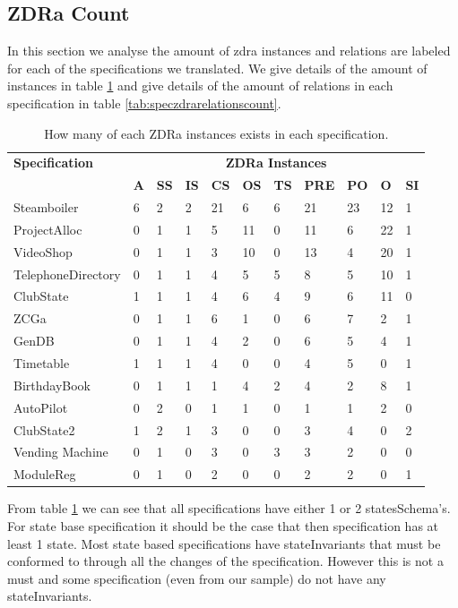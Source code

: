 \subsection{ZDRa Count}

In this section we analyse the amount of \gls{zdra} instances and relations are
labeled for each of the specifications we translated. We give details of the
amount of instances in table \ref{tab:speczdracount} and give details of the
amount of relations in each specification in table
\ref{tab:speczdrarelationscount}.

\begin{table}[H]
\centering
\begin{tabular}{|l |l | l |l | l| l | l | l | l | l | l |}
\hline
\textbf{Specification} & \multicolumn{10}{c|}{\textbf{ZDRa Instances}}\\
\cline{2-11}
 & \textbf{A} & \textbf{SS} & \textbf{IS} & \textbf{CS} & \textbf{OS} &
 \textbf{TS} & \textbf{PRE} & \textbf{PO} & \textbf{O} & \textbf{SI}  \\
\hline
Steamboiler & 6 & 2 & 2 & 21 & 6 & 6 & 21 & 23 & 12 & 1  \\
ProjectAlloc & 0 & 1 & 1 & 5 & 11 & 0 & 11 & 6 & 22 & 1 \\
VideoShop &  0 & 1 & 1 & 3 & 10 & 0 & 13 & 4 & 20 & 1  \\
TelephoneDirectory & 0 & 1 & 1 & 4 & 5 & 5 & 8 & 5 & 10 & 1 \\
ClubState & 1 & 1 & 1 & 4 & 6 & 4 & 9 & 6 & 11 & 0 \\
ZCGa & 0 & 1 & 1 & 6 & 1 & 0 & 6 & 7 & 2 & 1 \\
GenDB & 0 & 1 & 1 & 4 & 2 & 0 & 6 & 5 & 4 & 1 \\
Timetable & 1 & 1 & 1 & 4 & 0 & 0 & 4 & 5 & 0 & 1 \\
BirthdayBook & 0 & 1 & 1 & 1 & 4 & 2 & 4 & 2 & 8 & 1 \\
AutoPilot & 0 & 2 & 0 & 1 & 1 & 0 & 1 & 1 & 2 & 0 \\
ClubState2 & 1 & 2 & 1 & 3 & 0 & 0 & 3 & 4 & 0 & 2 \\
Vending Machine & 0 & 1 & 0 & 3 & 0 & 3 & 3 & 2 & 0 & 0 \\
ModuleReg & 0 & 1 & 0 & 2 & 0 & 0 & 2 & 2 & 0 & 1 \\
\hline
\end{tabular}
\caption{How many of each ZDRa instances exists in each specification. \label{tab:speczdracount}}
\end{table}

From table \ref{tab:speczdracount} we can see that all specifications have
either 1 or 2 statesSchema's. For state base specification it should be the case
that then specification has at least 1 state. Most state based specifications
have stateInvariants that must be conformed to through all the changes of the
specification. However this is not a must and some specification (even from our
sample) do not have any stateInvariants. 

